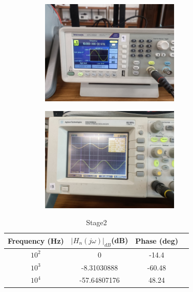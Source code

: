 \documentclass[a4paper,12pt]{article}
\begin{document}
\begin{figure}[H]
    \centering
    \begin{subfigure}{0.5\textwidth}
        \centering
        \includegraphics[height=5cm]{figs/Stage2/10000/para.jpeg}
    \end{subfigure}%
    \begin{subfigure}{0.5\textwidth}
        \centering
        \includegraphics[height=5cm]{figs/Stage2/10000/plot.jpeg}
    \end{subfigure}
\end{figure}
\begin{table}[H]
    \centering
    \begin{tabular}{|c|c|c|c|}
        \hline
        Frequency (Hz) &  $|H_n(j\omega)|_{dB}$(dB) & Phase (deg) \\
        \hline
        $10^2$ & 0 &-14.4 \\
        $10^3$ & -8.31030888 & -60.48 \\
        $10^4$ & -57.64807176& 48.24 \\
        \hline
    \end{tabular}
    \caption{Stage2}

    
\end{table}
\end{document}
